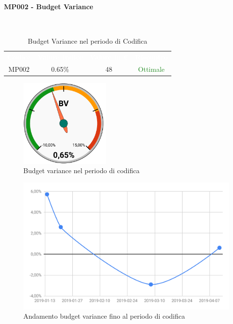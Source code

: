\paragraph{MP002 - Budget Variance}\mbox{}\\[0,3cm]
    \begin{table}[H]
        \centering
        \begin{tabular}{cccc}
            \rowcolor{greySWEight}
            \textcolor{white}{\textbf{Codice}} &
            \textcolor{white}{\textbf{Valore Indice}}&
            \textcolor{white}{\textbf{Valore in €}}&
            \textcolor{white}{\textbf{Riscontro}}\\
            MP002 & 0.65\% & 48 & \textcolor{ForestGreen}{Ottimale}\\
        \end{tabular}
        \caption{Budget Variance nel periodo di Codifica}
    \end{table}
    \begin{figure}[H]
        \centering
        \includegraphics[width=45mm]{sez/App_Esito/Qualifica/graph/BV_RQ.pdf}
        \caption{Budget variance nel periodo di codifica}
    \end{figure}
    \begin{figure}[H]
        \centering
        \includegraphics[width=0.7\linewidth]{sez/App_Esito/Qualifica/graph/storicoBV_RQ.pdf}
        \caption{Andamento budget variance fino al periodo di codifica}
    \end{figure}